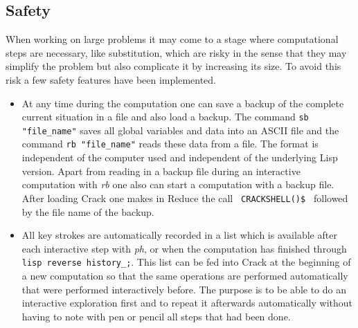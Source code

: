 \documentclass[12pt]{article}
\begin{document}
\subsection{Safety}
  When working on large problems it may come to a stage where computational
  steps are necessary, like substitution, which are risky in the sense
  that they may simplify the problem but also complicate it by
  increasing its size. To avoid this risk a few safety features have
  been implemented.
  \begin{itemize}
  \item At any time during the computation one can save a backup of
    the complete current situation in a file and also load a backup.
    The command {\tt sb "file\_name"} saves all global variables and
    data into an ASCII file and the command {\tt rb "file\_name"} reads
    these data from a file. The format is independent of the computer
    used and independent of the underlying {\sc Lisp} version.
    Apart from reading in a backup file during an interactive
    computation with {\em rb} one also can start a computation with
    a backup file. After loading {\sc Crack} one makes in {\sc Reduce}
    the call \verb+ CRACKSHELL()$ + %
    followed by the file name of the backup.
  \item All key strokes are automatically recorded in a list which is
    available after each interactive step with {\em ph}, or when the
    computation has finished through {\tt lisp reverse history\_;}.
    This list can be fed into {\sc Crack} at the beginning
    of a new computation so that the same operations are performed
    automatically that were performed interactively before. The
    purpose is to be able to do an interactive exploration first and
    to repeat it afterwards automatically without having to note with
    pen or pencil all steps that had been done.


\end{itemize}
\end{document}
